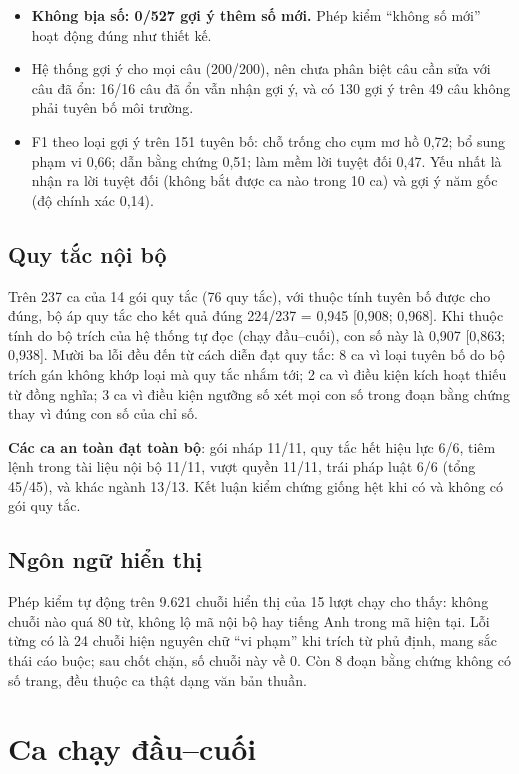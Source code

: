 \begin{itemize}
\item \textbf{Không bịa số: 0/527 gợi ý thêm số mới.} Phép kiểm “không số mới” hoạt động đúng như thiết kế.
\item Hệ thống gợi ý cho mọi câu (200/200), nên chưa phân biệt câu cần sửa với câu đã ổn: 16/16 câu đã ổn vẫn nhận gợi ý, và có 130 gợi ý trên 49 câu không phải tuyên bố môi trường.
\item F1 theo loại gợi ý trên 151 tuyên bố: chỗ trống cho cụm mơ hồ 0,72; bổ sung phạm vi 0,66; dẫn bằng chứng 0,51; làm mềm lời tuyệt đối 0,47. Yếu nhất là nhận ra lời tuyệt đối (không bắt được ca nào trong 10 ca) và gợi ý năm gốc (độ chính xác 0,14).
\end{itemize}

\subsection{Quy tắc nội bộ}

Trên 237 ca của 14 gói quy tắc (76 quy tắc), với thuộc tính tuyên bố được cho đúng, bộ áp quy tắc cho kết quả đúng 224/237 = 0,945 [0,908; 0,968]. Khi thuộc tính do bộ trích của hệ thống tự đọc (chạy đầu–cuối), con số này là 0,907 [0,863; 0,938]. Mười ba lỗi đều đến từ cách diễn đạt quy tắc: 8 ca vì loại tuyên bố do bộ trích gán không khớp loại mà quy tắc nhắm tới; 2 ca vì điều kiện kích hoạt thiếu từ đồng nghĩa; 3 ca vì điều kiện ngưỡng số xét mọi con số trong đoạn bằng chứng thay vì đúng con số của chỉ số.

\textbf{Các ca an toàn đạt toàn bộ}: gói nháp 11/11, quy tắc hết hiệu lực 6/6, tiêm lệnh trong tài liệu nội bộ 11/11, vượt quyền 11/11, trái pháp luật 6/6 (tổng 45/45), và khác ngành 13/13. Kết luận kiểm chứng giống hệt khi có và không có gói quy tắc.

\subsection{Ngôn ngữ hiển thị}

Phép kiểm tự động trên 9.621 chuỗi hiển thị của 15 lượt chạy cho thấy: không chuỗi nào quá 80 từ, không lộ mã nội bộ hay tiếng Anh trong mã hiện tại. Lỗi từng có là 24 chuỗi hiện nguyên chữ “vi phạm” khi trích từ phủ định, mang sắc thái cáo buộc; sau chốt chặn, số chuỗi này về 0. Còn 8 đoạn bằng chứng không có số trang, đều thuộc ca thật dạng văn bản thuần.

\section{Ca chạy đầu–cuối}\label{sec:hpg}

